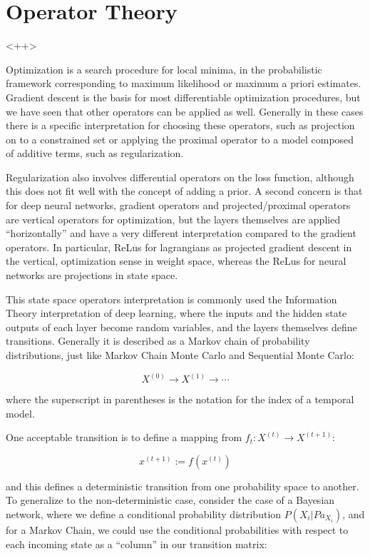 \documentclass[a4paper]{article}
\begin{document}
\section{Operator Theory}<++>

Optimization is a search procedure for local minima, in the probabilistic framework corresponding to maximum likelihood or maximum a priori estimates. 
Gradient descent is the basis for most differentiable optimization procedures, but we have seen that other operators can be applied as well. 
Generally in these cases there is a specific interpretation for choosing these operators, such as projection on to a constrained set or applying the proximal operator to a model composed of additive terms, such as regularization. 

Regularization also involves differential operators on the loss function, although this does not fit well with the concept of adding a prior. 
A second concern is that for deep neural networks, gradient operators and projected/proximal operators are vertical operators for optimization, but the layers themselves are applied ``horizontally'' and have a very different interpretation compared to the gradient operators. 
In particular, ReLus for lagrangians as projected gradient descent in the vertical, optimization sense in weight space, whereas the ReLus for neural networks are projections in state space. 

This state space operators interpretation is commonly used the Information Theory interpretation of deep learning, where the inputs and the hidden state outputs of each layer become random variables, and the layers themselves define transitions. 
Generally it is described as a Markov chain of probability distributions, just like Markov Chain Monte Carlo and Sequential Monte Carlo:

\begin{equation}
  X^{(0)} \rightarrow X^{(1)} \rightarrow \cdots
\end{equation}

where the superscript in parentheses is the notation for the index of a temporal model.

One acceptable transition is to define a mapping from $f_t: X^{(t)} \rightarrow X^{(t+1)}$:

\begin{equation}
  x^{(t+1)} := f( x^{(t)} )
\end{equation}

and this defines a deterministic transition from one probability space to another. 
To generalize to the non-deterministic case, consider the case of a Bayesian network, where we define a conditional probability distribution $P( X_i \vert Pa_{X_i} )$, and for a Markov Chain, we could use the conditional probabilities with respect to each incoming state as a ``column'' in our transition matrix:
\end{document}
